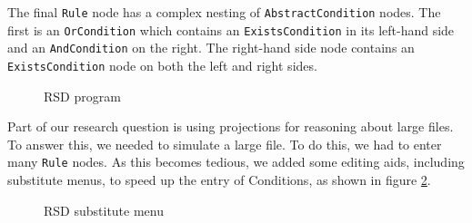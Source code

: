 The final \texttt{Rule} node has a complex nesting of \texttt{AbstractCondition} nodes.
The first is an \texttt{OrCondition} which contains an \texttt{ExistsCondition} in its left-hand side and an \texttt{AndCondition} on the right.
The right-hand side node contains an \texttt{ExistsCondition} node on both the left and right sides. 

\begin{figure}[h]
    \centering
    \caption{RSD program}
    \label{fig:RSDProgram}
\end{figure}

\newpage

Part of our research question is using projections for reasoning about large files.
To answer this, we needed to simulate a large file.
To do this, we had to enter many \texttt{Rule} nodes.
As this becomes tedious, we added some editing aids, including substitute menus, to speed up the entry of Conditions, as shown in figure \ref{fig:RSDSubstituteMenu}.

\begin{figure}[h]
    \centering
    \caption{RSD substitute menu}
    \label{fig:RSDSubstituteMenu}
\end{figure}

